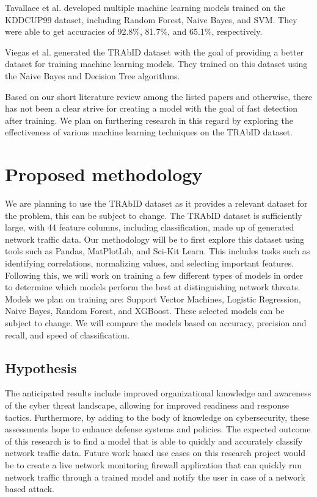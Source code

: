 Tavallaee et al. developed multiple machine learning models trained on the KDDCUP99 dataset, including Random Forest, Naive Bayes, and SVM. They were able to get accuracies of 92.8\%, 81.7\%, and 65.1\%, respectively. \cite{tavallaee2009detailed}

Viegas et al. generated the TRAbID dataset with the goal of providing a better dataset for training machine learning models. They trained on this dataset using the Naive Bayes and Decision Tree algorithms. \cite{viegas2017toward}

Based on our short literature review among the listed papers and otherwise, there has not been a clear strive for creating a model with the goal of fast detection after training. We plan on furthering research in this regard by exploring the effectiveness of various machine learning techniques on the TRAbID dataset.

\section{Proposed methodology}
We are planning to use the TRAbID dataset \cite{viegas2017toward} as it provides a relevant dataset for the problem, this can be subject to change. The TRAbID dataset is sufficiently large, with 44 feature columns, including classification, made up of generated network traffic data. Our methodology will be to first explore this dataset using tools such as Pandas, MatPlotLib, and Sci-Kit Learn. This includes tasks such as identifying correlations, normalizing values, and selecting important features. Following this, we will work on training a few different types of models in order to determine which models perform the best at distinguishing network threats. Models we plan on training are: Support Vector Machines, Logistic Regression, Naive Bayes, Random Forest, and XGBoost. These selected models can be subject to change. We will compare the models based on accuracy, precision and recall, and speed of classification.

\subsection{Hypothesis}
The anticipated results include improved organizational knowledge and awareness of the cyber threat landscape, allowing for improved readiness and response tactics. Furthermore, by adding to the body of knowledge on cybersecurity, these assessments hope to enhance defense systems and policies. The expected outcome of this research is to find a model that is able to quickly and accurately classify network traffic data. Future work based use cases on this research project would be to create a live network monitoring firewall application that can quickly run network traffic through a trained model and notify the user in case of a network based attack.

